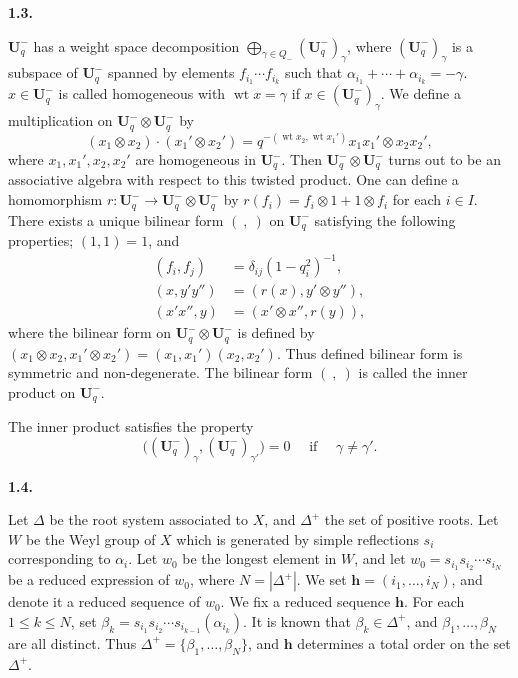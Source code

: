\documentclass[12pt]{amsart}
\renewcommand\a{\alpha}
\renewcommand\b{\beta}
\newcommand\g{\gamma}
\renewcommand\d{\delta}
\newcommand\vD{\varDelta}
\renewcommand{\1}{\mathbb 1}
\newcommand\BU{\mathbf U}
\newcommand\Bh{\mathbf h}
\newcommand\iv{^{-1}}
\newcommand\weit{\operatorname{wt}}
\numberwithin{equation}{section}
\def \para#1{\par\medskip\textbf{#1}
              \addtocounter{thm}{1}}
\begin{document}
\para{1.3.}
$\BU_q^-$ has a weight space decomposition $\bigoplus_{\g \in Q_-}(\BU_q^-)_{\g}$,
where $(\BU_q^-)_{\g}$ is a subspace of $\BU_q^-$ spanned by elements $f_{i_1}\cdots f_{i_k}$
such that $\a_{i_1} + \cdots + \a_{i_k} = -\g$. $x \in \BU_q^-$ is called homogeneous
with $\weit x = \g$ if $x \in (\BU_q^-)_{\g}$.  We define a multiplication
on $\BU_q^-\otimes \BU_q^-$ by
\begin{equation*}
(x_1\otimes x_2)\cdot (x_1'\otimes x_2') = q^{-(\weit x_2, \weit x_1')}x_1x_1'\otimes x_2x_2',
\end{equation*}
where $x_1, x_1', x_2, x_2'$ are homogeneous in $\BU_q^-$. Then $\BU_q^-\otimes \BU_q^-$
turns out to be an associative algebra with respect to this twisted product.
One can define a homomorphism $r : \BU_q^- \to \BU_q^-\otimes \BU_q^-$ by
$r(f_i) = f_i\otimes 1 + 1 \otimes f_i$ for each $i \in I$.
There exists a unique bilinear form $(\ ,\ )$ on $\BU_q^-$ satisfying the following
properties; $(1, 1) = 1$, and
\begin{align*}
  (f_i, f_j) &= \d_{ij}(1-q_i^2)\iv, \\
  (x, y'y'') &= (r(x), y'\otimes y''),  \\
  (x'x'', y) &= (x'\otimes x'', r(y)),
\end{align*}
where the bilinear form on $\BU_q^-\otimes \BU_q^-$ is defined by
$(x_1\otimes x_2, x_1'\otimes x_2') = (x_1,x_1')(x_2, x_2')$.
Thus defined bilinear form is symmetric and non-degenerate.
The bilinear form $(\ ,\ )$ is called the inner product on $\BU_q^-$.
\par
The inner product satisfies the property
\begin{equation*}
\tag{1.3.1}  
\bigl((\BU_q^-)_{\g}, (\BU_q^-)_{\g'}\bigr) = 0 \quad\text{ if } \quad \g \ne \g'.
\end{equation*}
\para{1.4.}
Let $\vD$ be the root system associated to $X$, and $\vD^+$ the set of
positive roots.
Let $W$ be the Weyl group of $X$ which is generated by
simple reflections $s_i$ corresponding to $\a_i$.
Let $w_0$ be the longest element in $W$, and
let $w_0 = s_{i_1}s_{i_2}\cdots s_{i_N}$ be a reduced expression of $w_0$,
where $N = |\vD^+|$.  We set $\Bh = (i_1, \dots, i_N)$, and denote it
a reduced sequence of $w_0$. We fix a reduced sequence $\Bh$.  For each
$1 \le k \le N$, set $\b_k = s_{i_1}s_{i_2}\cdots s_{i_{k-1}}(\a_{i_k})$.
It is known that $\b_k \in \vD^+$, and $\b_1, \dots, \b_N$ are all distinct.
Thus $\vD^+ = \{ \b_1, \dots, \b_N\}$, and $\Bh$ determines a total order on
the set $\vD^+$.
\par
\end{document}
